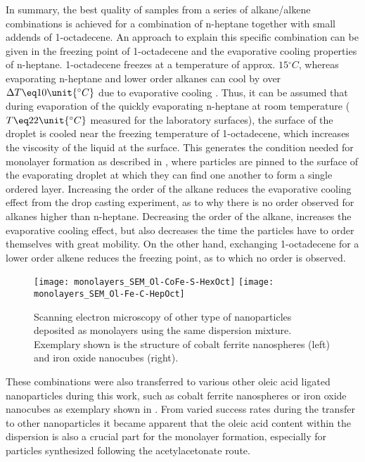 \documentclass[\main/dresen_thesis.tex]{subfiles}
\begin{document}
  In summary, the best quality of samples from a series of alkane/alkene combinations is achieved for a combination of n-heptane together with small addends of 1-octadecene.
  An approach to explain this specific combination can be given in the freezing point of 1-octadecene and the evaporative cooling properties of n-heptane.
  1-octadecene freezes at a temperature of approx. $15 \unit{^\circ C}$, whereas evaporating n-heptane and lower order alkanes can cool by over $\Delta T \eq 10 \unit{^\circ C}$ due to evaporative cooling \cite{Tuckermann_2002_Evapo}.
  Thus, it can be assumed that during evaporation of the quickly evaporating n-heptane at room temperature ($T \eq 22 \unit{^\circ C}$ measured for the laboratory surfaces), the surface of the droplet is cooled near the freezing temperature of 1-octadecene, which increases the viscosity of the liquid at the surface.
  This generates the condition needed for monolayer formation as described in \cite{Bigioni_2006_Kinet}, where particles are pinned to the surface of the evaporating droplet at which they can find one another to form a single ordered layer.
  Increasing the order of the alkane reduces the evaporative cooling effect from the drop casting experiment, as to why there is no order observed for alkanes higher than n-heptane.
  Decreasing the order of the alkane, increases the evaporative cooling effect, but also decreases the time the particles have to order themselves with great mobility.
  On the other hand, exchanging 1-octadecene for a lower order alkene reduces the freezing point, as to which no order is observed.

  \begin{figure}[tb]
    \centering
    \texttt{[image: monolayers\_SEM\_Ol-CoFe-S-HexOct]}
    \texttt{[image: monolayers\_SEM\_Ol-Fe-C-HepOct]}
    \caption{\label{fig:monolayers:preparation:solventVariation:spheresIron}Scanning electron microscopy of other type of nanoparticles deposited as monolayers using the same dispersion mixture. Exemplary shown is the structure of cobalt ferrite nanospheres (left) and iron oxide nanocubes (right).}
  \end{figure}
  These combinations were also transferred to various other oleic acid ligated nanoparticles during this work, such as cobalt ferrite nanospheres or iron oxide nanocubes as exemplary shown in .
  From varied success rates during the transfer to other nanoparticles it became apparent that the oleic acid content within the dispersion is also a crucial part for the monolayer formation, especially for particles synthesized following the acetylacetonate route.
\end{document}
